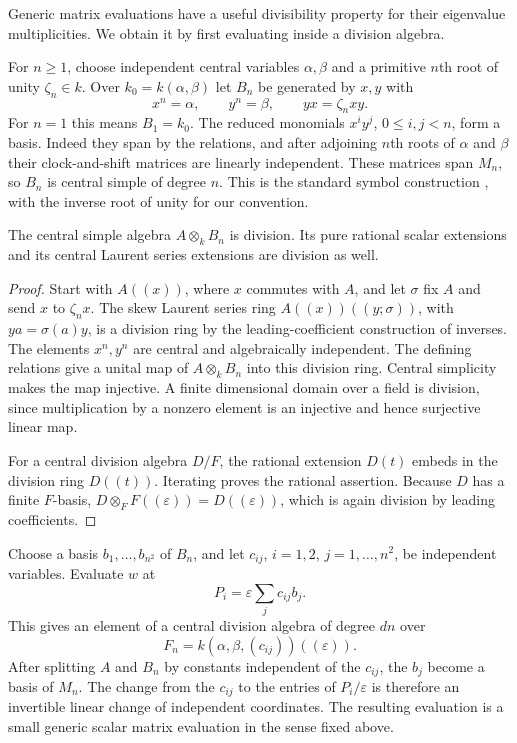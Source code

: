 Generic matrix evaluations have a useful divisibility property for
their eigenvalue multiplicities.  We obtain it by first evaluating
inside a division algebra.

For $n\ge1$, choose independent central variables $\alpha,\beta$
and a primitive $n$th root of unity $\zeta_n\in k$.  Over
$k_0=k(\alpha,\beta)$ let $B_n$ be generated by $x,y$ with
\[
 x^n=\alpha,\qquad y^n=\beta,\qquad yx=\zeta_nxy.
\]
For $n=1$ this means $B_1=k_0$.  The reduced monomials
$x^iy^j$, $0\le i,j<n$, form a basis.  Indeed they span by the
relations, and after adjoining $n$th roots of $\alpha$ and $\beta$
their clock-and-shift matrices are linearly independent.  These
matrices span $M_n$, so $B_n$ is central simple of degree $n$.
This is the standard symbol construction
\cite[Corollary~2.5.5(1)]{GilleSzamuely2006}, with the inverse
root of unity for our convention.

\begin{lemma}\label{lem:symbol-division}
The central simple algebra $A\otimes_k B_n$ is division.  Its pure
rational scalar extensions and its central Laurent series extensions
are division as well.
\end{lemma}

\begin{proof}
Start with $A((x))$, where $x$ commutes with $A$, and let $\sigma$
fix $A$ and send $x$ to $\zeta_nx$.  The skew Laurent series ring
$A((x))((y;\sigma))$, with $ya=\sigma(a)y$, is a division ring by
the leading-coefficient construction of inverses.  The elements
$x^n,y^n$ are central and algebraically independent.  The defining
relations give a unital map of $A\otimes_k B_n$ into this division
ring.  Central simplicity makes the map injective.  A finite
dimensional domain over a field is division, since multiplication by
a nonzero element is an injective and hence surjective linear map.

For a central division algebra $D/F$, the rational extension $D(t)$
embeds in the division ring $D((t))$.  Iterating proves the rational
assertion.  Because $D$ has a finite $F$-basis,
$D\otimes_F F((\varepsilon))=D((\varepsilon))$, which is again
division by leading coefficients.
\end{proof}

Choose a basis $b_1,\ldots,b_{n^2}$ of $B_n$, and let
$c_{ij}$, $i=1,2$, $j=1,\ldots,n^2$, be independent variables.
Evaluate $w$ at
\[
 P_i=\varepsilon\sum_j c_{ij}b_j.
\]
This gives an element of a central division algebra of degree $dn$
over
\[
 F_n=k(\alpha,\beta,(c_{ij}))((\varepsilon)).
\]
After splitting $A$ and $B_n$ by constants independent of the $c_{ij}$,
the $b_j$ become a basis of $M_n$.  The change from the $c_{ij}$ to
the entries of $P_i/\varepsilon$ is therefore an invertible linear
change of independent coordinates.  The resulting evaluation is a
small generic scalar matrix evaluation in the sense fixed above.

